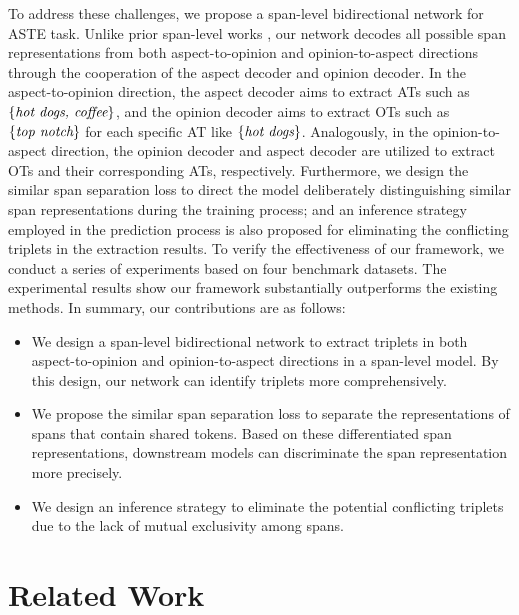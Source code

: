 \documentclass[11pt]{article}
\begin{document}
To address these challenges, we propose a span-level bidirectional network for ASTE task. Unlike prior span-level works \cite{DBLP:conf/acl/XuCB20}, our network decodes all possible span representations from both aspect-to-opinion and opinion-to-aspect directions through the cooperation of the aspect decoder and opinion decoder. In the aspect-to-opinion direction, the aspect decoder aims to extract ATs such as $\left\{\emph{hot dogs, coffee}\right\}$, and the opinion decoder aims to extract OTs such as $\left\{\emph{top notch}\right\}$ for each specific AT like $\left\{\emph{hot dogs}\right\}$. Analogously, in the opinion-to-aspect direction, the opinion decoder and aspect decoder are utilized to extract OTs and their corresponding ATs, respectively. Furthermore, we design the similar span separation loss to direct the model deliberately distinguishing similar span representations during the training process; and an inference strategy employed in the prediction process is also proposed for eliminating the conflicting triplets in the extraction results. To verify the effectiveness of our framework, we conduct a series of experiments based on four benchmark datasets. The experimental results show our framework substantially outperforms the existing methods. In summary, our contributions are as follows:
\begin{itemize}
	
	\item We design a span-level bidirectional network to extract triplets in both aspect-to-opinion and opinion-to-aspect directions in a span-level model. By this design, our network can identify triplets more comprehensively.
	
	\item We propose the similar span separation loss to separate the representations of spans that contain shared tokens. Based on these differentiated span representations, downstream models can discriminate the span representation more precisely.
	
	\item We design an inference strategy to eliminate the potential conflicting triplets due to the lack of mutual exclusivity among spans.
\end{itemize}

\section{Related Work}
\end{document}
